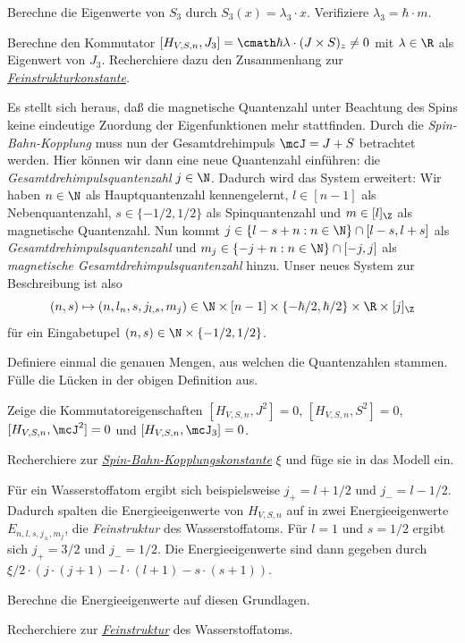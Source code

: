 \documentclass{subfiles}
\begin{document}
    \begin{Aufgabe}
        \nr{} Berechne die Eigenwerte von $S_3$ durch $S_3(x) = \lambda_3\cdot x$. Verifiziere $\lambda_3 = \hbar\cdot m$. 

        \nr{} Berechne den Kommutator $[H_{V,S,n},J_3] = \cmath\hbar\lambda\cdot (J\times S)_z\neq 0$ mit $\lambda\in\R$ als Eigenwert von $J_3$. Recherchiere dazu den Zusammenhang zur \href{https://en.wikipedia.org/wiki/Fine-structure_constant}{\emph{Feinstrukturkonstante}}.
    \end{Aufgabe}
    Es stellt sich heraus, daß die magnetische Quantenzahl unter Beachtung des Spins keine eindeutige Zuordung der Eigenfunktionen mehr stattfinden. Durch die \emph{Spin-Bahn-Kopplung} muss nun der Gesamtdrehimpuls $\mcJ = J + S$ betrachtet werden. Hier können wir dann eine neue Quantenzahl einführen: die \emph{Gesamtdrehimpulsquantenzahl} $j\in\N$. Dadurch wird das System erweitert: Wir haben $n\in\N$ als Hauptquantenzahl kennengelernt, $l \in [n - 1]$ als Nebenquantenzahl, $s\in\{-1/2,1/2\}$ als Spinquantenzahl und $m\in [l]_\Z$ als magnetische Quantenzahl. Nun kommt $j\in \{l-s + n:n\in\N\}\cap[l-s,l+s]$ als \emph{Gesamtdrehimpulsquantenzahl} und $m_j\in \{-j + n:n\in\N\}\cap[-j,j]$ als \emph{magnetische Gesamtdrehimpulsquantenzahl} hinzu. Unser neues System zur Beschreibung ist also
    \[
        (n,s)\mapsto (n,l_n,s,j_{l,s},m_j) \in\N\times [n-1]\times\{-\hbar/2,\hbar/2\}\times\R\times [j]_\Z
    \]
    für ein Eingabetupel $(n,s)\in\N\times\{-1/2,1/2\}$.
    \begin{Aufgabe}
        \nr{} Definiere einmal die genauen Mengen, aus welchen die Quantenzahlen stammen. Fülle die Lücken in der obigen Definition aus.

        \nr{} Zeige die Kommutatoreigenschaften $[H_{V,S,n},J^2] = 0$, $[H_{V,S,n},S^2] = 0$, $[H_{V,S,n},\mcJ^2] = 0$ und $[H_{V,S,n},\mcJ_3] = 0$.  

        \nr{} Recherchiere zur \href{https://de.wikipedia.org/wiki/Spin-Bahn-Kopplung}{\emph{Spin-Bahn-Kopplungskonstante}} $\xi$ und füge sie in das Modell ein.
    \end{Aufgabe}
    Für ein Wasserstoffatom ergibt sich beispielsweise $j_+ = l + 1/2$ und $j_- = l - 1/2$. Dadurch spalten die Energieeigenwerte von $H_{V,S,n}$ auf in zwei Energieeigenwerte $E_{n,l,s,j_\pm,m_j}$, die \emph{Feinstruktur} des Wasserstoffatoms. Für $l = 1$ und $s = 1/2$ ergibt sich $j_+ = 3/2$ und $j_- = 1/2$. Die Energieeigenwerte sind dann gegeben durch $\xi/2\cdot (j\cdot(j+1) - l\cdot(l + 1) - s\cdot (s + 1))$. 
    \begin{Aufgabe}
        \nr{} Berechne die Energieeigenwerte auf diesen Grundlagen.

        \nr{} Recherchiere zur \href{https://de.wikipedia.org/wiki/Feinstruktur_(Physik)}{\emph{Feinstruktur}} des Wasserstoffatoms.
    \end{Aufgabe}
\end{document}
